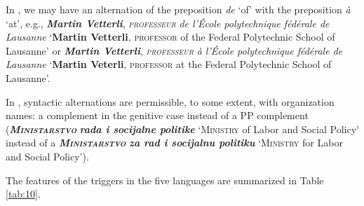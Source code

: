 \documentclass[output=paper]{langsci/langscibook}
\newcommand{\trigger}[1]{\textsc{#1}}
\begin{document}
In , we may have an alternation of the preposition \textit{de}
‘of’ with the preposition \textit{à} ‘at’, e.g., \textbf{\textit{Martin
Vetterli}}, \textit{\trigger{professeur}} \textit{de l'École
polytechnique fédérale de Lausanne} `\textbf{Martin Vetterli},
\trigger{professor} of the Federal Polytechnic School of Lausanne' or
\textbf{\textit{Martin Vetterli}}, \textit{\trigger{professeur}}
\textit{à l'École polytechnique fédérale de Lausanne }`\textbf{Martin
Veterli}, \trigger{professor} at the Federal Polytechnic School of
Lausanne'.




In , syntactic alternations are permissible, to some extent, with
organization names: a complement in the genitive case instead of a PP complement
(\textbf{\textit{\trigger{Ministarstvo}}} \textbf{\textit{rada i socijalne politike}} `\trigger{Ministry} of Labor and
Social Policy’ instead of a \textbf{\textit{\trigger{Ministarstvo}}}
\textbf{\textit{za rad i socijalnu politiku}}
`\trigger{Ministry} for Labor and Social Policy’).

The features of the triggers in the five languages are summarized in Table \ref{tab:10}.
\end{document}
